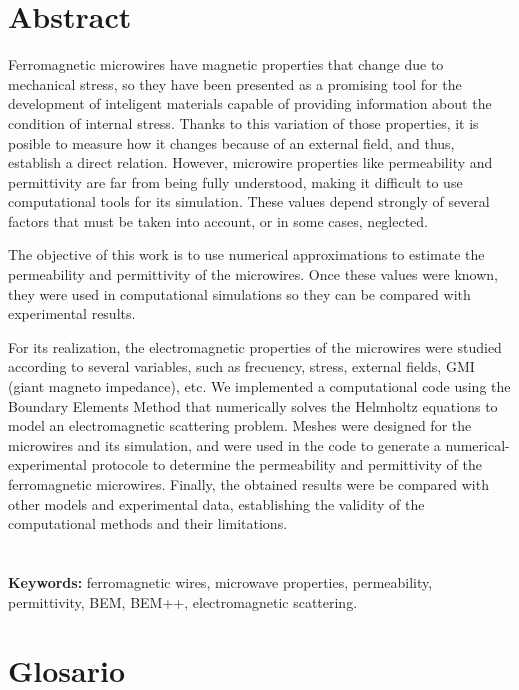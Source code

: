 \documentclass[12pt,letterpaper]{report}
\numberwithin{equation}{section}
\begin{document}
\pagebreak
\chapter*{Abstract}

Ferromagnetic microwires have magnetic properties that change due to mechanical stress, so they have been presented as a promising tool for the development of inteligent materials capable of providing information about the condition of internal stress. Thanks to this variation of those properties, it is posible to measure how it changes because of an external field, and thus, establish a direct relation. However, microwire properties like permeability and permittivity are far from being fully understood, making it difficult to use computational tools for its simulation. These values depend strongly of several factors that must be taken into account, or in some cases, neglected.

The objective of this work is to use numerical approximations to estimate the permeability and permittivity of the microwires. Once these values were known, they were used in computational simulations so they can be compared with experimental results. 

For its realization, the electromagnetic properties of the microwires were studied according to several variables, such as frecuency, stress, external fields, GMI (giant magneto impedance), etc. We implemented a computational code using the Boundary Elements Method that numerically solves the Helmholtz equations to model an electromagnetic scattering problem.  Meshes were designed for the microwires and its simulation, and were used in the code to generate a numerical-experimental protocole to determine the permeability and permittivity of the ferromagnetic microwires. Finally, the obtained results were be compared with other models and experimental data, 	establishing the validity of the computational methods and their limitations.
 \\
 \\
 \\

\noindent \textbf{Keywords:} ferromagnetic wires, microwave properties, permeability, permittivity, BEM, BEM++, electromagnetic scattering.


\pagebreak
\chapter*{Glosario}
\end{document}
